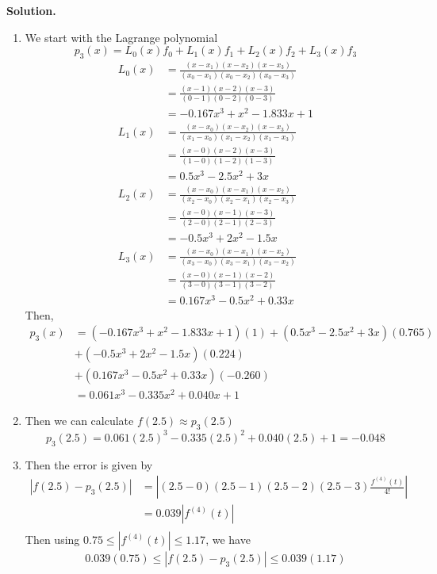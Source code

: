 \documentclass[openany]{report}
\begin{document}
\textbf{Solution.} 
\begin{enumerate}[label=(\roman*)]
    \item We start with the Lagrange polynomial
    \[p_3(x) = L_0(x)f_0 + L_1(x)f_1 + L_2(x)f_2 + L_3(x)f_3\]
    \begin{align*}
        L_0(x) &= \frac{(x-x_1)(x-x_2)(x-x_3)}{(x_0-x_1)(x_0-x_2)(x_0-x_3)}\\
        &= \frac{(x-1)(x-2)(x-3)}{(0-1)(0-2)(0-3)}\\
        &= -0.167x^3 + x^2 - 1.833x + 1\\
        L_1(x) &= \frac{(x-x_0)(x-x_2)(x-x_3)}{(x_1-x_0)(x_1-x_2)(x_1-x_3)}\\
        &= \frac{(x-0)(x-2)(x-3)}{(1-0)(1-2)(1-3)}\\
        &= 0.5x^3 - 2.5x^2 + 3x\\
        L_2(x) &= \frac{(x-x_0)(x-x_1)(x-x_2)}{(x_2-x_0)(x_2-x_1)(x_2-x_3)}\\
        &= \frac{(x-0)(x-1)(x-3)}{(2-0)(2-1)(2-3)}\\
        &= -0.5x^3 + 2x^2 - 1.5x\\
        L_3(x) &= \frac{(x-x_0)(x-x_1)(x-x_2)}{(x_3-x_0)(x_3-x_1)(x_3-x_2)}\\
        &= \frac{(x-  0)(x-1)(x-2)}{(3-0)(3-1)(3-2)}\\
        &= 0.167x^3 - 0.5x^2 + 0.33x
    \end{align*}
    Then,
    \begin{align*}
        p_3(x) &= (-0.167x^3 + x^2 - 1.833x + 1)(1) + ( 0.5x^3 - 2.5x^2 + 3x)(0.765)\\
        &+ (-0.5x^3 + 2x^2 - 1.5x)(0.224)\\
        &+ (0.167x^3 - 0.5x^2 + 0.33x)(-0.260)\\
        &= 0.061x^3 - 0.335x^2 + 0.040x + 1  
    \end{align*} 
    \item Then we can calculate $f(2.5) \approx p_3(2.5)$
    \[p_3(2.5) = 0.061(2.5)^3 - 0.335(2.5)^2 + 0.040(2.5) + 1 = -0.048\]
    \item Then the error is given by 
    \begin{align*}
        |f(2.5) - p_3(2.5)| &= \left|(2.5-0)(2.5-1)(2.5-2)(2.5-3)\frac{f^{(4)}(t)}{4!}\right|\\
        &= 0.039|f^{(4)}(t)|\\
    \end{align*}
    Then using $0.75 \leq |f^{(4)}(t)| \leq 1.17$, we have
    \[0.039(0.75) \leq |f(2.5) - p_3(2.5)| \leq 0.039(1.17)\]
\end{enumerate}
\end{document}
